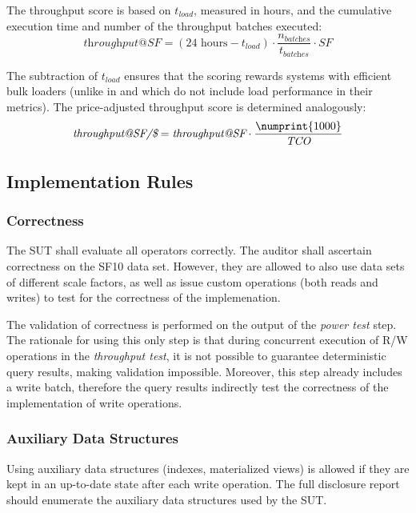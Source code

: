 The throughput score is based on $t_\textit{load}$, measured in hours,
and the cumulative execution time and number of the throughput batches executed:
$$
\textit{throughput@SF} =
    (24\text{ hours} - t_\textit{load})
    \cdot
    \frac{n_\textit{batches}}{t_\textit{batches}}
    \cdot
    \textit{SF}
$$

The subtraction of $t_\textit{load}$ ensures that the scoring rewards systems with efficient bulk loaders (unlike in \tpcH and \tpcDS which do not include load performance in their metrics).
The price-adjusted throughput score is determined analogously: %
$$ \textit{throughput@SF/\$} = \textit{throughput@SF} \cdot \frac{\numprint{1000}}{\textit{TCO}} $$

\subsection{Implementation Rules}
\label{sec:bi-implementation-rules}

\subsubsection{Correctness}
\label{sec:bi-correcntess}

The SUT shall evaluate all operators correctly.
The auditor shall ascertain correctness on the SF10 data set. However, they are allowed to also use data sets of different scale factors, as well as issue custom operations (both reads and writes) to test for the correctness of the implemenation.

The validation of correctness is performed on the output of the \emph{power test} step.
The rationale for using this only step is that during concurrent execution of R/W operations in the \emph{throughput test}, it is not possible to guarantee deterministic query results, making validation impossible. Moreover, this step already includes a write batch, therefore the query results indirectly test the correctness of the implementation of write operations.

\subsubsection{Auxiliary Data Structures}
\label{sec:bi-auxiliary-data-structures}

Using auxiliary data structures (\eg indexes, materialized views) is allowed if they are kept in an up-to-date state after each write operation. The full disclosure report should enumerate the auxiliary data structures used by the SUT. 

